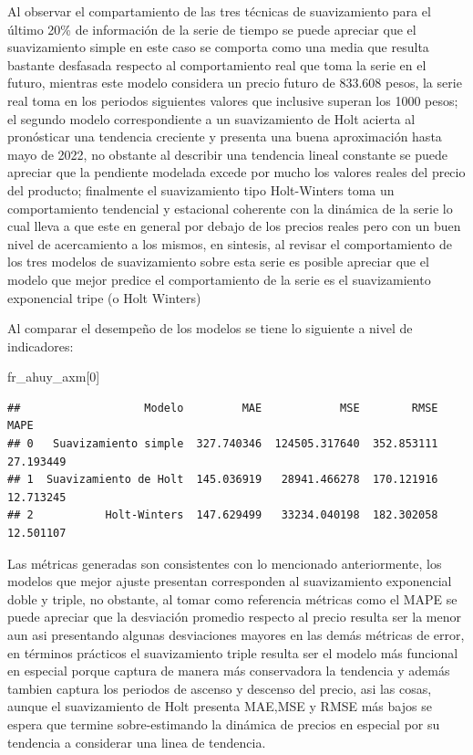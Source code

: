 \documentclass[
]{book}
\newenvironment{Shaded}{\begin{snugshade}}{\end{snugshade}}
\newcommand{\DecValTok}[1]{\textcolor[rgb]{0.00,0.00,0.81}{#1}}
\newcommand{\NormalTok}[1]{#1}
\begin{document}
Al observar el compartamiento de las tres técnicas de suavizamiento para el último 20\% de información de la serie de tiempo se puede apreciar que el suavizamiento simple en este caso se comporta como una media que resulta bastante desfasada respecto al comportamiento real que toma la serie en el futuro, mientras este modelo considera un precio futuro de 833.608 pesos, la serie real toma en los periodos siguientes valores que inclusive superan los 1000 pesos; el segundo modelo correspondiente a un suavizamiento de Holt acierta al pronósticar una tendencia creciente y presenta una buena aproximación hasta mayo de 2022, no obstante al describir una tendencia lineal constante se puede apreciar que la pendiente modelada excede por mucho los valores reales del precio del producto; finalmente el suavizamiento tipo Holt-Winters toma un comportamiento tendencial y estacional coherente con la dinámica de la serie lo cual lleva a que este en general por debajo de los precios reales pero con un buen nivel de acercamiento a los mismos, en sintesis, al revisar el comportamiento de los tres modelos de suavizamiento sobre esta serie es posible apreciar que el modelo que mejor predice el comportamiento de la serie es el suavizamiento exponencial tripe (o Holt Winters)

Al comparar el desempeño de los modelos se tiene lo siguiente a nivel de indicadores:

\begin{Shaded}
\begin{Highlighting}[]

\NormalTok{fr\_ahuy\_axm[}\DecValTok{0}\NormalTok{]}
\end{Highlighting}
\end{Shaded}

\begin{verbatim}
##                   Modelo         MAE            MSE        RMSE       MAPE
## 0   Suavizamiento simple  327.740346  124505.317640  352.853111  27.193449
## 1  Suavizamiento de Holt  145.036919   28941.466278  170.121916  12.713245
## 2           Holt-Winters  147.629499   33234.040198  182.302058  12.501107
\end{verbatim}

Las métricas generadas son consistentes con lo mencionado anteriormente, los modelos que mejor ajuste presentan corresponden al suavizamiento exponencial doble y triple, no obstante, al tomar como referencia métricas como el MAPE se puede apreciar que la desviación promedio respecto al precio resulta ser la menor aun asi presentando algunas desviaciones mayores en las demás métricas de error, en términos prácticos el suavizamiento triple resulta ser el modelo más funcional en especial porque captura de manera más conservadora la tendencia y además tambien captura los periodos de ascenso y descenso del precio, asi las cosas, aunque el suavizamiento de Holt presenta MAE,MSE y RMSE más bajos se espera que termine sobre-estimando la dinámica de precios en especial por su tendencia a considerar una linea de tendencia.
\end{document}
